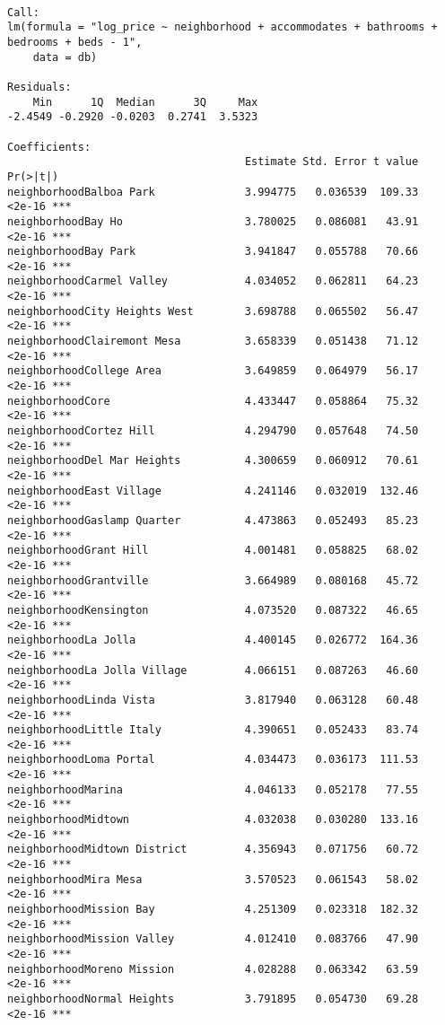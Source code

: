 \documentclass[
  letterpaper,
  krantz2]{style/krantz}
\begin{document}
\begin{verbatim}

Call:
lm(formula = "log_price ~ neighborhood + accommodates + bathrooms + bedrooms + beds - 1", 
    data = db)

Residuals:
    Min      1Q  Median      3Q     Max 
-2.4549 -0.2920 -0.0203  0.2741  3.5323 

Coefficients:
                                     Estimate Std. Error t value Pr(>|t|)    
neighborhoodBalboa Park              3.994775   0.036539  109.33   <2e-16 ***
neighborhoodBay Ho                   3.780025   0.086081   43.91   <2e-16 ***
neighborhoodBay Park                 3.941847   0.055788   70.66   <2e-16 ***
neighborhoodCarmel Valley            4.034052   0.062811   64.23   <2e-16 ***
neighborhoodCity Heights West        3.698788   0.065502   56.47   <2e-16 ***
neighborhoodClairemont Mesa          3.658339   0.051438   71.12   <2e-16 ***
neighborhoodCollege Area             3.649859   0.064979   56.17   <2e-16 ***
neighborhoodCore                     4.433447   0.058864   75.32   <2e-16 ***
neighborhoodCortez Hill              4.294790   0.057648   74.50   <2e-16 ***
neighborhoodDel Mar Heights          4.300659   0.060912   70.61   <2e-16 ***
neighborhoodEast Village             4.241146   0.032019  132.46   <2e-16 ***
neighborhoodGaslamp Quarter          4.473863   0.052493   85.23   <2e-16 ***
neighborhoodGrant Hill               4.001481   0.058825   68.02   <2e-16 ***
neighborhoodGrantville               3.664989   0.080168   45.72   <2e-16 ***
neighborhoodKensington               4.073520   0.087322   46.65   <2e-16 ***
neighborhoodLa Jolla                 4.400145   0.026772  164.36   <2e-16 ***
neighborhoodLa Jolla Village         4.066151   0.087263   46.60   <2e-16 ***
neighborhoodLinda Vista              3.817940   0.063128   60.48   <2e-16 ***
neighborhoodLittle Italy             4.390651   0.052433   83.74   <2e-16 ***
neighborhoodLoma Portal              4.034473   0.036173  111.53   <2e-16 ***
neighborhoodMarina                   4.046133   0.052178   77.55   <2e-16 ***
neighborhoodMidtown                  4.032038   0.030280  133.16   <2e-16 ***
neighborhoodMidtown District         4.356943   0.071756   60.72   <2e-16 ***
neighborhoodMira Mesa                3.570523   0.061543   58.02   <2e-16 ***
neighborhoodMission Bay              4.251309   0.023318  182.32   <2e-16 ***
neighborhoodMission Valley           4.012410   0.083766   47.90   <2e-16 ***
neighborhoodMoreno Mission           4.028288   0.063342   63.59   <2e-16 ***
neighborhoodNormal Heights           3.791895   0.054730   69.28   <2e-16 ***

\end{verbatim}
\end{document}
